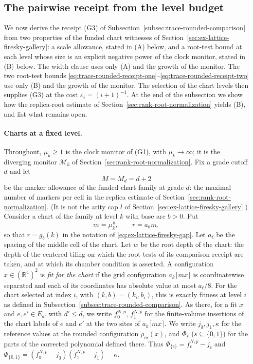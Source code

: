 \subsection{The pairwise receipt from the level budget}
\label{subsec:trace-rounded-receipt}

We now derive the receipt (G3) of
Subsection~\ref{subsec:trace-rounded-comparison} from two properties of
the funded chart witnesses of
Section~\ref{sec:ex-lattice-firesky-gallery}: a scale allowance, stated in
(A) below, and a root-test bound at each level whose size is an explicit
negative power of the clock monitor, stated in (B) below. The width clause
uses only (A) and the growth of the monitor. The two root-test bounds
\eqref{eq:trace-rounded-receipt-one}--\eqref{eq:trace-rounded-receipt-two}
use only (B) and the growth of the monitor. The selection of the chart
levels then supplies (G3) at the cost $\varepsilon_i=(i+1)^{-1}$. At the
end of the subsection we show how the replica-root estimate of
Section~\ref{sec:rank-root-normalization} yields (B), and list what
remains open.

\paragraph{Charts at a fixed level.}
Throughout, $\mu_k\ge1$ is the clock monitor of (G1), with
$\mu_k\to\infty$; it is the diverging monitor $\mathcal M_k$ of
Section~\ref{sec:rank-root-normalization}. Fix a grade cutoff $d$ and
let
\[
 M=M_d=d+2
\]
be the marker allowance of the funded chart family at grade $d$: the
maximal number of markers per cell in the replica estimate of
Section~\ref{sec:rank-root-normalization}. (It is not the arity cap $l$
of Section~\ref{sec:ex-lattice-firesky-gallery}.) Consider a chart of the
family at level $k$ with base arc $b>0$. Put
\[
 m=\mu_k^{\,b},\qquad r=a_km,
\]
so that $r=g_b(k)$ in the notation of \eqref{eq:ex-lattice-firesky-gap}.
Let $a_{\ell}$ be the spacing of the middle cell of the chart. Let $w$ be
the root depth of the chart: the depth of the centered tiling on which
the root tests of its comparison receipt are taken, and at which its
chamber condition is asserted. A configuration $x\in(\mathbb R^4)^2$ is
\emph{fit for the chart} if the grid configuration $a_k\lceil mx\rceil$
is coordinatewise separated and each of its coordinates has absolute
value at most $a_\ell/8$. For the chart selected at index $i$, with
$(k,b)=(k_i,b_i)$, this is exactly fitness at level $i$ as defined in
Subsection~\ref{subsec:trace-rounded-comparison}. As there, for a fit
$x$ and $e,e'\in E_{d'}$ with $d'\le d$, we write $f_0^{N,p}$,
$f_1^{N,p}$ for the finite-volume insertions of the chart labels of $e$
and $e'$ at the two sites of $a_k\lceil mx\rceil$. We write
$j_0,j_1,\kappa$ for the reference values at the rounded configuration
$\rho_m(x)$, and $\Phi_s$ ($s\subseteq\{0,1\}$) for the parts of the
corrected polynomial defined there. Thus $\Phi_{\{c\}}=f_c^{N,p}-j_c$ and
$\Phi_{\{0,1\}}=(f_0^{N,p}-j_0)(f_1^{N,p}-j_1)-\kappa$.

